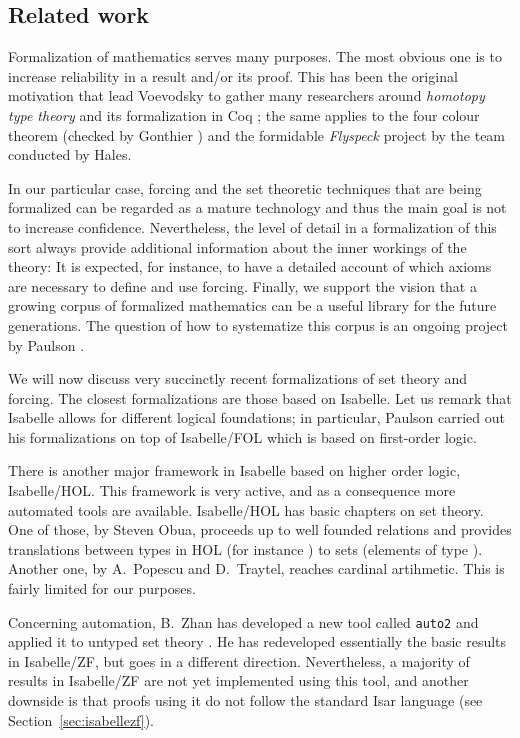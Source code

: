 \subsection{Related work}\label{sec:related-work}
Formalization of mathematics serves many purposes. The most obvious
one is to increase reliability in a result and/or its proof. This has
been the original motivation that lead Voevodsky to gather many
researchers around \emph{homotopy type theory} and its formalization in Coq
\cite{hottbook}; the same applies to the four colour theorem (checked by
Gonthier \cite{MR2463991}) and the formidable \emph{Flyspeck} project
\cite{MR3659768} by the team conducted by Hales.  

In our particular case, forcing and the set theoretic techniques that
are being formalized can be regarded as a mature technology and thus
the main goal is not to increase confidence. Nevertheless, the level
of detail in a formalization of this sort always provide additional
information about the inner workings of the theory: It is expected, for
instance, to have a detailed account of which axioms are necessary to
define and use forcing. Finally, we support the vision that a growing
corpus of formalized mathematics can be a useful library for the
future generations. The question of how to systematize this corpus is
an ongoing project by Paulson \cite{ALEXANDRIA}.

We will now discuss very succinctly recent formalizations of
set theory and forcing. The closest formalizations are those based on
Isabelle. Let us remark that Isabelle allows for different logical
foundations; in particular, Paulson carried out his formalizations
on top of Isabelle/FOL which is based on first-order logic.

There is another major framework in Isabelle based on higher order
logic, Isabelle/HOL. This framework is very active, and as a 
consequence more automated tools are available. Isabelle/HOL has 
basic chapters on set theory. One of those, by Steven Obua, proceeds up to
well founded relations and provides translations between types in HOL
(for instance ) to  sets  (elements of type
). Another one, by A.~Popescu and D.~Traytel, reaches
cardinal artihmetic. This is fairly limited for our purposes.

Concerning automation, B.~Zhan has developed a new tool called
\texttt{auto2} and applied it to untyped set theory
\cite{10.1007/978-3-319-66107-0_32}. He has redeveloped essentially
the basic results in Isabelle/ZF, but goes in a different
direction. Nevertheless, a majority of results in
Isabelle/ZF are not yet implemented using this tool, and  another
downside is that proofs using it do not follow the standard Isar
language (see Section~\ref{sec:isabellezf}).

